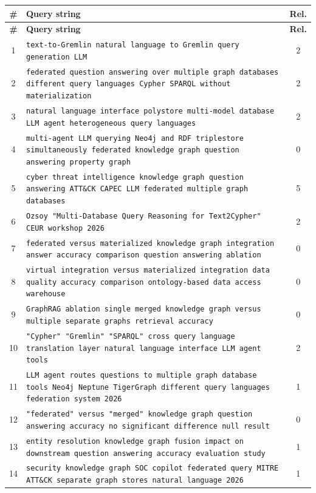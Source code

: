 \documentclass[11pt,a4paper]{article}
\begin{document}
\begin{center}
\footnotesize
\begin{longtable}{@{}c>{\RaggedRight}p{13.6cm}c@{}}
\toprule
\textbf{\#} & \textbf{Query string} & \textbf{Rel.} \\
\midrule
\endfirsthead
\toprule
\textbf{\#} & \textbf{Query string} & \textbf{Rel.} \\
\midrule
\endhead
1 & \texttt{text-to-Gremlin natural language to Gremlin query generation LLM} & 2 \\
2 & \texttt{federated question answering over multiple graph databases different query languages Cypher SPARQL without materialization} & 2 \\
3 & \texttt{natural language interface polystore multi-model database LLM agent heterogeneous query languages} & 2 \\
4 & \texttt{multi-agent LLM querying Neo4j and RDF triplestore simultaneously federated knowledge graph question answering property graph} & 0 \\
5 & \texttt{cyber threat intelligence knowledge graph question answering ATT\&CK CAPEC LLM federated multiple graph databases} & 5 \\
6 & \texttt{Ozsoy "Multi-Database Query Reasoning for Text2Cypher" CEUR workshop 2026} & 2 \\
7 & \texttt{federated versus materialized knowledge graph integration answer accuracy comparison question answering ablation} & 0 \\
8 & \texttt{virtual integration versus materialized integration data quality accuracy comparison ontology-based data access warehouse} & 0 \\
9 & \texttt{GraphRAG ablation single merged knowledge graph versus multiple separate graphs retrieval accuracy} & 0 \\
10 & \texttt{"Cypher" "Gremlin" "SPARQL" cross query language translation layer natural language interface LLM agent tools} & 2 \\
11 & \texttt{LLM agent routes questions to multiple graph database tools Neo4j Neptune TigerGraph different query languages federation system 2026} & 1 \\
12 & \texttt{"federated" versus "merged" knowledge graph question answering accuracy no significant difference null result} & 0 \\
13 & \texttt{entity resolution knowledge graph fusion impact on downstream question answering accuracy evaluation study} & 1 \\
14 & \texttt{security knowledge graph SOC copilot federated query MITRE ATT\&CK separate graph stores natural language 2026} & 1 \\

\end{longtable}
\end{center}
\end{document}
